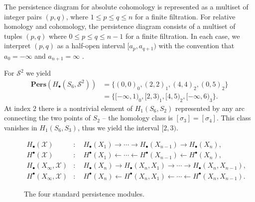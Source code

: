 The persistence diagram for absolute cohomology is represented as a multiset of integer
pairs $(p,q)$, where $1 \leq p \leq q \leq n$ for a finite filtration. For relative
homology and cohomology, the persistence diagram consists of a multiset of
tuples $(p,q)$ where $0 \leq p \leq q \leq n-1$ for a finite filtration. In each
case, we interpret $(p,q)$ as a half-open interval $[a_{p}, a_{q+1})$ with the
convention that $a_{0} = -\infty$ and $a_{n+1} = \infty$
\cite[\S 2.4]{de2011dualities}.

\begin{example}
	For $\mathcal{S}^{2}$ we yield
	\begin{align}
		\textbf{Pers}(H_{\bullet}(S_{6},\mathcal{S}^{2})) & = \{(0,0)_{0}, (2,2)_{1}, (4,4)_{2}, (0,5)_{2}\}               \\
		                                                  & = \{[-\infty, 1)_{0}, [2,3)_{1}, [4,5)_{2}, [-\infty,6)_{3}\}.
	\end{align}
	At index $2$ there is a nontrivial element of $H_{1}(S_{6},S_{2})$ represented
	by any arc connecting the two points of $S_{2}$ \cite[\S 2.4]{de2011dualities} --
	the homology class is $[\sigma_{3}] = [\sigma_{4}]$. This class vanishes in $H_{1}(S_{6},S_{3})$, thus we yield the interval $[2,3)$.
\end{example}

\begin{figure}
	\begin{align*}
		H_{\bullet}(\mathcal{X})             & : \quad H_{\bullet}(X_{1}) \rightarrow \cdots \rightarrow H_{\bullet}(X_{n-1}) \rightarrow H_{\bullet}(X_{n}),             \\
		H^{\bullet}(\mathcal{X})             & : \quad H^{\bullet}(X_{1}) \leftarrow \cdots \leftarrow H^{\bullet}(X_{n-1}) \leftarrow H^{\bullet}(X_{n}),                \\
		H_{\bullet}(X_{\infty}, \mathcal{X}) & : \quad H_{\bullet}(X_{n}) \rightarrow H_{\bullet}(X_{n},X_{1}) \rightarrow \cdots \rightarrow H_{\bullet}(X_{n},X_{n-1}), \\
		H^{\bullet}(X_{\infty}, \mathcal{X}) & : \quad H^{\bullet}(X_{n}) \leftarrow H^{\bullet}(X_{n},X_{1}) \leftarrow \cdots \leftarrow H^{\bullet}(X_{n}, X_{n-1}).
	\end{align*}
	\caption{The four standard persistence modules.}
\end{figure}

